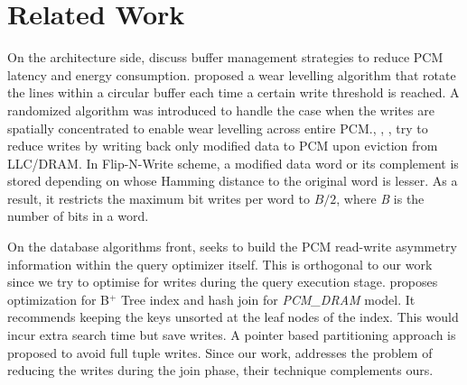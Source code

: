 \section{Related Work}
\label{relWork}
On the architecture side, \cite{lee} discuss buffer management strategies to reduce PCM latency and energy consumption. \cite{wear} proposed a wear levelling algorithm that rotate the lines within a circular buffer each time a certain write threshold is reached. A randomized algorithm was introduced to handle the case when the writes are spatially concentrated to enable wear levelling across entire PCM.\cite{qureshi}, \cite{write}, \cite{lee}, \cite{zhou} try to reduce writes by writing back only modified data to PCM upon eviction from LLC/DRAM. In Flip-N-Write scheme\cite{flipnwrite}, a modified data word or its complement is stored depending on whose Hamming distance to the original word is lesser. As a result, it restricts the maximum bit writes per word to $B/2$, where \textit{B} is the number of bits in a word.

On the database algorithms front, \cite{cost_aware} seeks to build the PCM read-write asymmetry information within the query optimizer itself. This is orthogonal to our work since we try to optimise for writes during the query execution stage. \cite{chen} proposes optimization for B$^+$ Tree index and hash join for \textit{PCM\_DRAM} model. It recommends keeping the keys unsorted at the leaf nodes of the index. This would incur extra search time but save writes. A pointer based partitioning approach is proposed to avoid full tuple writes. Since our work, addresses the problem of reducing the writes during the join phase, their technique complements ours. 


